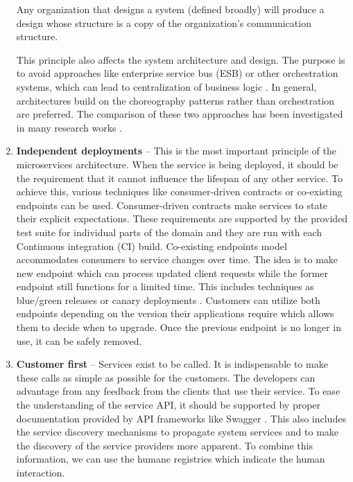 \documentclass[oneside,
  digital, %
  table,   %
  lof,     %
  lot,     %
]{fithesis3}
\begin{document}
\begin{enumerate}
    \begin{displayquote}
       Any organization that designs a system (defined broadly) will produce a design whose structure is a copy of the organization's communication structure.
    \end{displayquote}

    This principle also affects the system architecture and design. The purpose is to avoid approaches like enterprise service bus (ESB) or other orchestration systems, which can lead to centralization of business logic \cite{building_ms}. In general, architectures build on the choreography patterns rather than orchestration are preferred. The comparison of these two approaches has been investigated in many research works \cite{chor_and_orch, service_oriented_design, realtime_ws_orch}.
	
	\item \textbf{Independent deployments} -- This is the most important principle of the microservices architecture. When the service is being deployed, it should be the requirement that it cannot influence the lifespan of any other service. To achieve this, various techniques like consumer-driven contracts or co-existing endpoints can be used. Consumer-driven contracts make services to state their explicit expectations. These requirements are supported by the provided test suite for individual parts of the domain and they are run with each Continuous integration (CI) build. Co-existing endpoints model accommodates consumers to service changes over time. The idea is to make new endpoint which can process updated client requests while the former endpoint still functions for a limited time. This includes techniques as blue/green releases \cite{blue_green} or canary deployments \cite{canary_deploy}. Customers can utilize both endpoints depending on the version their applications require which allows them to decide when to upgrade. Once the previous endpoint is no longer in use, it can be safely removed.
	
	\item \textbf{Customer first} -- Services exist to be called. It is indispensable to make these calls as simple as possible for the customers. The developers can advantage from any feedback from the clients that use their service. To ease the understanding of the service API, it should be supported by proper documentation provided by API frameworks like Swagger \cite{swagger}. This also includes the service discovery mechanisms to propagate system services and to make the discovery of the service providers more apparent. To combine this information, we can use the humane registries \cite{humane_registry} which indicate the human interaction. 
	

\end{enumerate}
\end{document}
